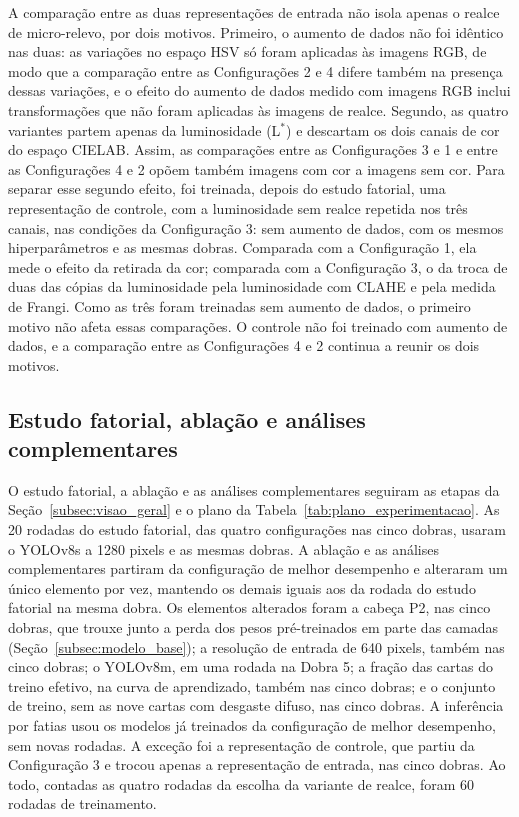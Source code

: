 \documentclass[
    12pt,                %
    openright,           %
    oneside,             %
    a4paper,             %
    english,             %
    brazil               %
]{abntex2}
\begin{document}
A comparação entre as duas representações de entrada não isola apenas
o realce de micro-relevo, por dois motivos. Primeiro, o aumento de
dados não foi idêntico nas duas: as variações no espaço HSV só foram
aplicadas às imagens RGB, de modo que a comparação entre as
Configurações 2 e 4 difere também na presença dessas variações, e o
efeito do aumento de dados medido com imagens RGB inclui
transformações que não foram aplicadas às imagens de realce. Segundo,
as quatro variantes partem apenas da luminosidade (L$^*$) e descartam
os dois canais de cor do espaço CIELAB. Assim, as comparações entre as
Configurações 3 e 1 e entre as Configurações 4 e 2 opõem também
imagens com cor a imagens sem cor. Para separar esse segundo efeito,
foi treinada, depois do estudo fatorial, uma representação de controle,
com a luminosidade sem realce repetida nos três canais, nas condições da
Configuração 3: sem aumento de dados, com os mesmos hiperparâmetros e as
mesmas dobras. Comparada com a Configuração 1, ela mede o efeito da
retirada da cor; comparada com a Configuração 3, o da troca de duas das
cópias da luminosidade pela luminosidade com CLAHE e pela medida de
Frangi. Como as três foram treinadas sem aumento de dados, o primeiro
motivo não afeta essas comparações. O controle não foi treinado com
aumento de dados, e a comparação entre as Configurações 4 e 2 continua
a reunir os dois motivos.

\subsection{Estudo fatorial, ablação e análises complementares}
\label{subsec:ablacao}

O estudo fatorial, a ablação e as análises complementares seguiram as
etapas da Seção~\ref{subsec:visao_geral} e o plano da
Tabela~\ref{tab:plano_experimentacao}. As 20 rodadas do estudo
fatorial, das quatro configurações nas cinco dobras, usaram o YOLOv8s a
1280 pixels e as mesmas dobras. A ablação e as análises complementares
partiram da configuração de melhor desempenho e alteraram um único
elemento por vez, mantendo os demais iguais aos da rodada do estudo
fatorial na mesma dobra. Os elementos alterados foram a cabeça P2, nas
cinco dobras, que trouxe junto a perda dos pesos pré-treinados em parte
das camadas (Seção~\ref{subsec:modelo_base}); a resolução de entrada de
640 pixels, também nas cinco dobras; o YOLOv8m, em uma rodada na Dobra
5; a fração das cartas do treino efetivo, na curva de aprendizado,
também nas cinco dobras; e o
conjunto de treino, sem as nove cartas com desgaste difuso, nas cinco
dobras. A
inferência por fatias usou os modelos já treinados da configuração de
melhor desempenho, sem novas rodadas. A exceção foi a representação de
controle, que partiu da Configuração 3 e trocou apenas a representação
de entrada, nas cinco dobras. Ao todo,
contadas as quatro rodadas da escolha da variante de realce, foram 60
rodadas de treinamento.
\end{document}
